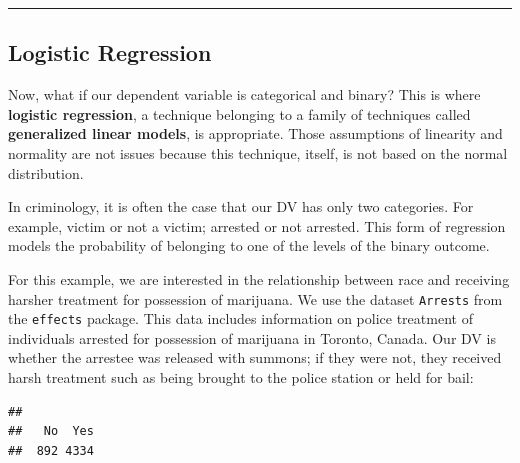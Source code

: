 \documentclass[
]{book}
\newenvironment{Shaded}{\begin{snugshade}}{\end{snugshade}}
\newcommand{\AttributeTok}[1]{\textcolor[rgb]{0.77,0.63,0.00}{#1}}
\newcommand{\CommentTok}[1]{\textcolor[rgb]{0.56,0.35,0.01}{\textit{#1}}}
\newcommand{\FunctionTok}[1]{\textcolor[rgb]{0.00,0.00,0.00}{#1}}
\newcommand{\NormalTok}[1]{#1}
\newcommand{\SpecialCharTok}[1]{\textcolor[rgb]{0.00,0.00,0.00}{#1}}
\newcommand{\StringTok}[1]{\textcolor[rgb]{0.31,0.60,0.02}{#1}}
\begin{document}
\begin{center}\rule{0.5\linewidth}{0.5pt}\end{center}

\hypertarget{logistic-regression}{%
\subsection{Logistic Regression}\label{logistic-regression}}

Now, what if our dependent variable is categorical and binary? This is where \textbf{logistic regression}, a technique belonging to a family of techniques called \textbf{generalized linear models}, is appropriate. Those assumptions of linearity and normality are not issues because this technique, itself, is not based on the normal distribution.

In criminology, it is often the case that our DV has only two categories. For example, victim or not a victim; arrested or not arrested. This form of regression models the probability of belonging to one of the levels of the binary outcome.

For this example, we are interested in the relationship between race and receiving harsher treatment for possession of marijuana. We use the dataset \texttt{Arrests} from the \texttt{effects} package. This data includes information on police treatment of individuals arrested for possession of marijuana in Toronto, Canada. Our DV is whether the arrestee was released with summons; if they were not, they received harsh treatment such as being brought to the police station or held for bail:

\begin{Shaded}
\end{Shaded}

\begin{verbatim}
## 
##   No  Yes 
##  892 4334
\end{verbatim}

\begin{Shaded}
\end{Shaded}
\end{document}
